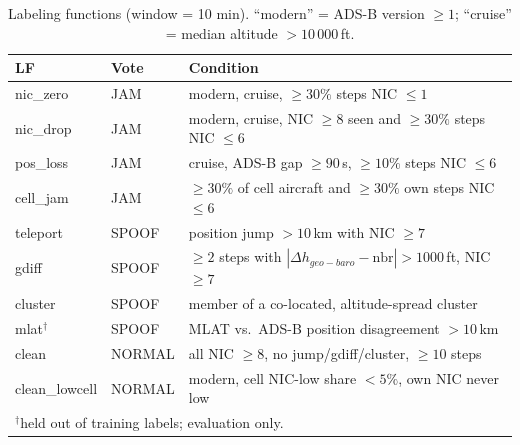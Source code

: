 \begin{table}[t]\centering\small
\caption{Labeling functions (window = 10 min). ``modern'' = ADS-B version $\ge1$; ``cruise'' = median altitude $>10\,000$\,ft.}
\label{tab:lfs}
\begin{tabular}{@{}lll@{}}\toprule
LF & Vote & Condition \\\midrule
nic\_zero & JAM & modern, cruise, $\ge30\%$ steps NIC $\le1$ \\
nic\_drop & JAM & modern, cruise, NIC $\ge8$ seen and $\ge30\%$ steps NIC $\le6$ \\
pos\_loss & JAM & cruise, ADS-B gap $\ge90$\,s, $\ge10\%$ steps NIC $\le6$ \\
cell\_jam & JAM & $\ge30\%$ of cell aircraft and $\ge30\%$ own steps NIC $\le6$ \\
teleport & SPOOF & position jump $>10$\,km with NIC $\ge7$ \\
gdiff & SPOOF & $\ge2$ steps with $|\Delta h_{geo-baro}-\text{nbr}|>1000$\,ft, NIC $\ge7$ \\
cluster & SPOOF & member of a co-located, altitude-spread cluster \\
mlat$^\dagger$ & SPOOF & MLAT vs.\ ADS-B position disagreement $>10$\,km \\
clean & NORMAL & all NIC $\ge8$, no jump/gdiff/cluster, $\ge10$ steps \\
clean\_lowcell & NORMAL & modern, cell NIC-low share $<5\%$, own NIC never low \\\bottomrule
\multicolumn{3}{l}{$^\dagger$held out of training labels; evaluation only.}
\end{tabular}
\end{table}
